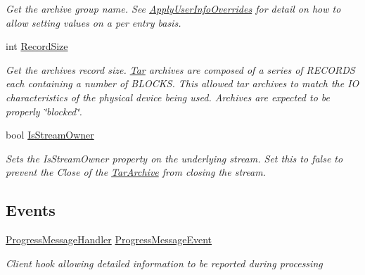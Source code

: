 \begin{DoxyCompactItemize}
\begin{DoxyCompactList}\small\item\em Get the archive group name. See \hyperlink{class_i_c_sharp_code_1_1_sharp_zip_lib_1_1_tar_1_1_tar_archive_a94d90eb52245f63a5ad06fb0289104ff}{Apply\+User\+Info\+Overrides} for detail on how to allow setting values on a per entry basis. \end{DoxyCompactList}\item 
int \hyperlink{class_i_c_sharp_code_1_1_sharp_zip_lib_1_1_tar_1_1_tar_archive_a18fbe5ee8f336048f583c2b192a69571}{Record\+Size}
\begin{DoxyCompactList}\small\item\em Get the archive\textquotesingle{}s record size. \hyperlink{namespace_i_c_sharp_code_1_1_sharp_zip_lib_1_1_tar}{Tar} archives are composed of a series of R\+E\+C\+O\+R\+DS each containing a number of B\+L\+O\+C\+KS. This allowed tar archives to match the IO characteristics of the physical device being used. Archives are expected to be properly \char`\"{}blocked\char`\"{}. \end{DoxyCompactList}\item 
bool \hyperlink{class_i_c_sharp_code_1_1_sharp_zip_lib_1_1_tar_1_1_tar_archive_a664546e5e899006e6a3c48331ffa95ed}{Is\+Stream\+Owner}
\begin{DoxyCompactList}\small\item\em Sets the Is\+Stream\+Owner property on the underlying stream. Set this to false to prevent the Close of the \hyperlink{class_i_c_sharp_code_1_1_sharp_zip_lib_1_1_tar_1_1_tar_archive}{Tar\+Archive} from closing the stream. \end{DoxyCompactList}\end{DoxyCompactItemize}
\subsection*{Events}
\begin{DoxyCompactItemize}
\item 
\hyperlink{namespace_i_c_sharp_code_1_1_sharp_zip_lib_1_1_tar_aceffb334332f726e9d8619ddf6e3bf96}{Progress\+Message\+Handler} \hyperlink{class_i_c_sharp_code_1_1_sharp_zip_lib_1_1_tar_1_1_tar_archive_a2471cdc0871512dd5a26250957268ad4}{Progress\+Message\+Event}
\begin{DoxyCompactList}\small\item\em Client hook allowing detailed information to be reported during processing \end{DoxyCompactList}\end{DoxyCompactItemize}


